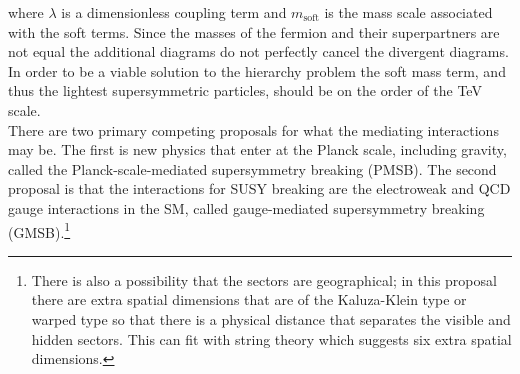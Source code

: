 where $\lambda$ is a dimensionless coupling term and $m_{\mathrm{soft}}$ is the mass scale associated with the soft terms.  Since the masses of the fermion and their superpartners are not equal the additional diagrams do not perfectly cancel the divergent diagrams.  In order to be a viable solution to the hierarchy problem the soft mass term, and thus the lightest supersymmetric particles, should be on the order of the TeV scale.\\%


There are two primary competing proposals for what the mediating interactions may be.  The first is new physics that enter at the Planck scale, including gravity, called the Planck-scale-mediated supersymmetry breaking (PMSB).  The second proposal is that the interactions for SUSY breaking are the electroweak and QCD gauge interactions in the SM, called gauge-mediated supersymmetry breaking (GMSB).\footnote{There is also a possibility that the sectors are geographical; in this proposal there are extra spatial dimensions that are of the Kaluza-Klein type or warped type so that there is a physical distance that separates the visible and hidden sectors.  This can fit with string theory which suggests six extra spatial dimensions.} \\ %


